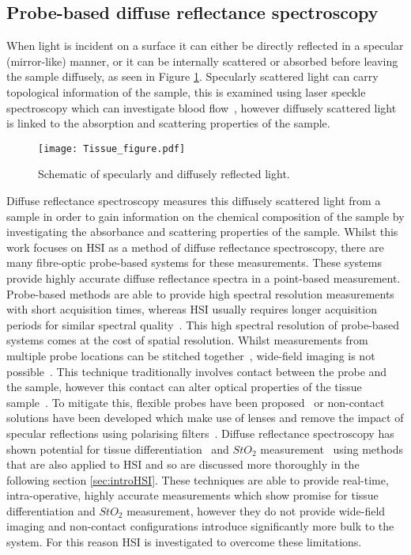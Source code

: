 \subsection{Probe-based diffuse reflectance spectroscopy}
When light is incident on a surface it can either be directly reflected in a specular (mirror-like) manner, or it can be internally scattered or absorbed before leaving the sample diffusely, as seen in Figure \ref{fig:diffuseR}. Specularly scattered light can carry topological information of the sample, this is examined using laser speckle spectroscopy which can investigate blood flow~\citep{Dunn2012}, however diffusely scattered light is linked to the absorption and scattering properties of the sample. 
\begin{figure}[h]
    \centering
    \texttt{[image: Tissue\_figure.pdf]}
    \caption{Schematic of specularly and diffusely reflected light.}
    \label{fig:diffuseR}
\end{figure}
Diffuse reflectance spectroscopy measures this diffusely scattered light from a sample in order to gain information on the chemical composition of the sample by investigating the absorbance and scattering properties of the sample. Whilst this work focuses on HSI as a method of diffuse reflectance spectroscopy, there are many fibre-optic probe-based systems for these measurements. These systems provide highly accurate diffuse reflectance spectra in a point-based measurement. Probe-based methods are able to provide high spectral resolution measurements with short acquisition times, whereas HSI usually requires longer acquisition periods for similar spectral quality~\citep{Dinish2017}. This high spectral resolution of probe-based systems comes at the cost of spatial resolution. Whilst measurements from multiple probe locations can be stitched together~\citep{Thrapp2020}, wide-field imaging is not possible~\citep{Nishidate2015}. This technique traditionally involves contact between the probe and the sample, however this contact can alter optical properties of the tissue sample~\citep{Miller2017}. To mitigate this, flexible probes have been proposed~\citep{Miller2017} or non-contact solutions have been developed which make use of lenses and remove the impact of specular reflections using polarising filters~\citep{Bish2011, Zhu2012}. %
Diffuse reflectance spectroscopy has shown potential for tissue differentiation~\citep{Skyrman2022} and $StO_2$ measurement~\citep{Fredriksson2020} using methods that are also applied to HSI and so are discussed more thoroughly in the following section \ref{sec:introHSI}. These techniques are able to provide real-time, intra-operative, highly accurate measurements which show promise for tissue differentiation and $StO_2$ measurement, however they do not provide wide-field imaging and non-contact configurations introduce significantly more bulk to the system. For this reason HSI is investigated to overcome these limitations. 

